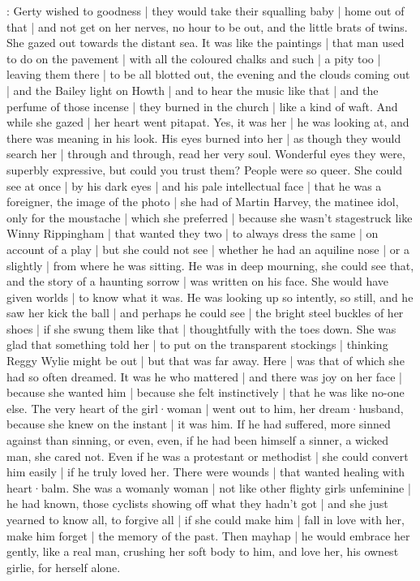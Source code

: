 :
Gerty wished to goodness |
they would take their squalling baby |
home out of that |
and not get on her nerves,
no hour to be out,
and the little brats of twins.
She gazed out towards the distant sea.
It was like the paintings |
that man used to do on the pavement |
with all the coloured chalks and such |
a pity too |
leaving them there |
to be all blotted out,
the evening and the clouds coming out |
and the Bailey light on Howth |
and to hear the music like that |
and the perfume of those incense |
they burned in the church |%
like a kind of waft.
And while she gazed |
her heart went pitapat.
Yes,
it was her |
he was looking at,
and there was meaning in his look.
His eyes burned into her |
as though they would search her |
through and through,
read her very soul.
Wonderful eyes they were,
superbly expressive,
but could you trust them?
People were so queer.
She could see at once |
by his dark eyes |
and his pale intellectual face |
that he was a foreigner,
the image of the photo |
she had of Martin Harvey,
the matinee idol,
only for the moustache |
which she preferred |
because she wasn't stagestruck like Winny Rippingham |
that wanted they two |
to always dress the same |
on account of a play |
but she could not see |%
whether he had an aquiline nose |
or a slightly  |
from where he was sitting.
He was in deep mourning,
she could see that,
and the story of a haunting sorrow |
was written on his face.
She would have given worlds |
to know what it was.
He was looking up so intently,
so still,
and he saw her kick the ball |
and perhaps he could see |
the bright steel buckles of her shoes |
if she swung them like that |
thoughtfully with the toes down.
She was glad that something told her |
to put on the transparent stockings |
thinking Reggy Wylie might be out |
but that was far away.
Here |
was that of which she had so often dreamed.
It was he who mattered |
and there was joy on her face |
because she wanted him |
because she felt instinctively |
that he was like no-one else.%
The very heart of the girl·woman |
went out to him,
her dream·husband,
because she knew on the instant |
it was him.
If he had suffered,
more sinned against than sinning,
or even,
even,
if he had been himself a sinner,
a wicked man,
she cared not.
Even if he was a protestant or methodist |
she could convert him easily |
if he truly loved her.
There were wounds |
that wanted healing with heart·balm.
She was a womanly woman |
not like other flighty girls unfeminine |
he had known,
those cyclists showing off what they hadn't got |
and she just yearned to know all,
to forgive all |
if she could make him |
fall in love with her,
make him forget |
the memory of the past.
Then mayhap |
he would embrace her gently,
like a real man,
crushing her soft body to him,%
and love her,
his ownest girlie,
for herself alone.

